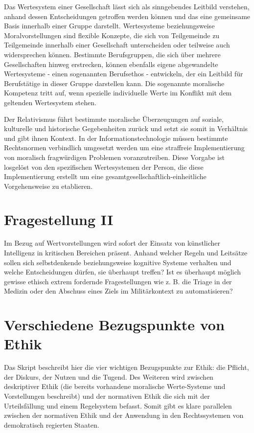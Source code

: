 \documentclass[journal]{IEEEtran}
\begin{document}
\begin{onecolumn}
Das Wertesystem einer Gesellschaft lässt sich als sinngebendes Leitbild verstehen, anhand dessen 
Entscheidungen getroffen werden können und das eine gemeinsame Basis innerhalb einer Gruppe darstellt. 
Wertesysteme beziehungsweise Moralvorstellungen sind flexible Konzepte, die sich von Teilgemeinde zu 
Teilgemeinde innerhalb einer Gesellschaft unterscheiden oder teilweise auch widersprechen können. 
Bestimmte Berufsgruppen, die sich über mehrere Gesellschaften hinweg erstrecken, können ebenfalls eigene 
abgewandelte Wertesysteme - einen sogenannten Berufsethos - entwickeln, der ein Leitbild für Berufstätige 
in dieser Gruppe darstellen kann. Die sogenannte moralische Kompetenz tritt auf, wenn spezielle
individuelle Werte im Konflikt mit dem geltenden Wertesystem stehen.

Der Relativismus führt bestimmte moralische Überzeugungen auf soziale, kulturelle und historische
Gegebenheiten zurück und setzt sie somit in Verhältnis und gibt ihnen Kontext.
In der Informationstechnologie müssen bestimmte Rechtsnormen verbindlich umgesetzt werden um eine 
straffreie Implementierung von moralisch fragwürdigen Problemen voranzutreiben. Diese Vorgabe ist
losgelöst von den spezifischen Wertesystemen der Person, die diese Implementierung erstellt um eine
gesamtgesellschaftlich-einheitliche Vorgehensweise zu etablieren.

\section*{Fragestellung II}

Im Bezug auf Wertvorstellungen wird sofort der Einsatz von künstlicher Intelligenz in kritischen 
Bereichen präsent. Anhand welcher Regeln und Leitsätze sollen sich selbstdenkende beziehungsweise 
kognitive Systeme verhalten und welche Entscheidungen dürfen, sie überhaupt treffen? Ist es überhaupt 
möglich gewisse ethisch extrem fordernde Fragestellungen wie z. B. die Triage in der Medizin oder den
Abschuss eines Ziels im Militärkontext zu automatisieren?

\newpage

\section{Verschiedene Bezugspunkte von Ethik}

Das Skript beschreibt hier die vier wichtigen Bezugspunkte zur Ethik: die Pflicht, der Diskurs,
der Nutzen und die Tugend. Des Weiteren wird zwischen deskriptiver Ethik (die bereits vorhandene
moralische Werte-Systeme und Vorstellungen beschreibt) und der normativen Ethik die sich mit der
Urteilsfällung und einem Regelsystem befasst. Somit gibt es klare parallelen zwischen der normativen
Ethik und der Anwendung in den Rechtssystemen von demokratisch regierten Staaten.


\end{onecolumn}
\end{document}
